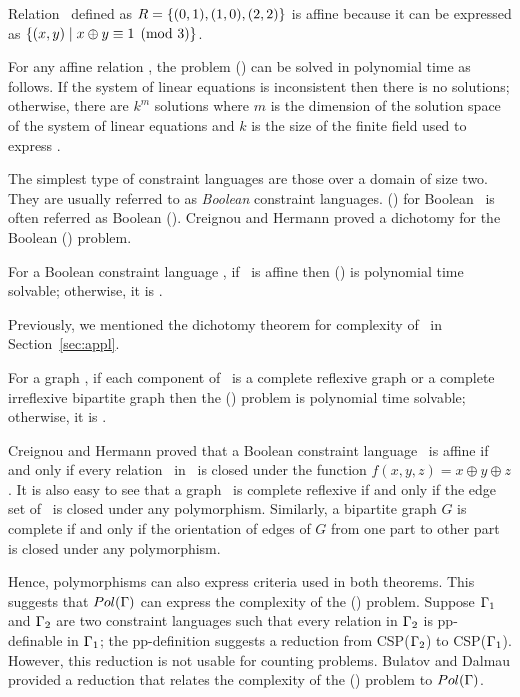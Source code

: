 \begin{example}
Relation \mR\ defined as \(R=\{{(0,1),(1,0),(2,2)}\}\) is affine because it can be expressed as 
\(\{{(x,y)\mid x \oplus y \equiv 1 \pmod{3}}\}\)\@.
\end{example}

For any affine relation \mR, the problem \ccsp(\mR) can be solved in polynomial time
as follows. If the system of linear equations is inconsistent
then there is no solutions; otherwise, there are \(k^m\) solutions where \(m\) is the
dimension of the solution space of the system of linear equations and
\(k\) is the size of the finite field used to express \mR\@.

The simplest type of constraint languages are those 
over a domain of size two. They are usually 
referred to as \emph{Boolean} constraint languages.
\ccsp(\mrelset) for Boolean \mrelset\ is often referred as Boolean \ccsp(\mrelset)\@.
Creignou and Hermann proved a dichotomy for the Boolean \ccsp(\mrelset) problem.

\begin{theorem}  
For a Boolean constraint language \mrelset,
if  \mrelset\ is affine then \ccsp(\mrelset) 
is polynomial time solvable; otherwise, it is \cpc\@.
\end{theorem}

Previously, we mentioned the dichotomy theorem for complexity of \ccsp\ in  Section~\ref{sec:appl}.

\begin{theorem} 
For a graph \mH, if each component of \mH\ is a complete reflexive graph
or a complete irreflexive bipartite graph then the \chom(\mH) problem 
is polynomial time solvable; otherwise, it is \cpc\@.
\end{theorem}

Creignou and Hermann \cite{Nadia} proved that a Boolean constraint language \mrelset\
is affine if and only if every relation \mR\ in \mrelset\
is closed under the function \(f(x,y,z)=x\oplus y \oplus z\). It is also easy to see that
a graph \mG\ is complete reflexive if and only if the edge set of \mG\ is closed under any
polymorphism. Similarly, a bipartite graph \(G\) is complete if and only if the orientation
of edges
of \(G\) from one part to other part is closed under any polymorphism.

Hence, polymorphisms can also express criteria used in both theorems. This suggests
that \(Pol(\Gamma)\) can express the complexity of the \ccsp(\mrelset) problem.
Suppose \(\Gamma_1\) and \(\Gamma_2\) are two constraint languages such that
every relation in \(\Gamma_2\) is pp-definable in \(\Gamma_1\); 
the pp-definition suggests a reduction from CSP(\(\Gamma_2\))
to CSP(\(\Gamma_1\))\@. However, this reduction is not usable for counting problems. 
Bulatov and Dalmau provided a reduction that relates 
the complexity of the \ccsp(\mrelset) problem to \(Pol(\Gamma)\)\@.

